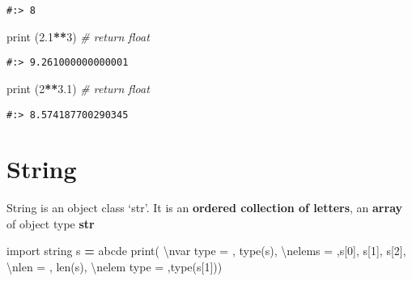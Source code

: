 \documentclass[
]{book}
\newenvironment{Shaded}{\begin{snugshade}}{\end{snugshade}}
\newcommand{\BuiltInTok}[1]{#1}
\newcommand{\CharTok}[1]{\textcolor[rgb]{0.5,0.5,0.5}{#1}}
\newcommand{\CommentTok}[1]{\textcolor[rgb]{0.37,0.37,0.37}{\textit{#1}}}
\newcommand{\DecValTok}[1]{\textcolor[rgb]{0.06,0.06,0.06}{#1}}
\newcommand{\FloatTok}[1]{\textcolor[rgb]{0.06,0.06,0.06}{#1}}
\newcommand{\ImportTok}[1]{#1}
\newcommand{\NormalTok}[1]{#1}
\newcommand{\OperatorTok}[1]{\textcolor[rgb]{0.43,0.43,0.43}{\textbf{#1}}}
\newcommand{\StringTok}[1]{\textcolor[rgb]{0.5,0.5,0.5}{#1}}
\begin{document}
\begin{verbatim}
#:> 8
\end{verbatim}

\begin{Shaded}
\begin{Highlighting}[]
\BuiltInTok{print}\NormalTok{ (}\FloatTok{2.1}\OperatorTok{**}\DecValTok{3}\NormalTok{)  }\CommentTok{\# return float}
\end{Highlighting}
\end{Shaded}

\begin{verbatim}
#:> 9.261000000000001
\end{verbatim}

\begin{Shaded}
\begin{Highlighting}[]
\BuiltInTok{print}\NormalTok{ (}\DecValTok{2}\OperatorTok{**}\FloatTok{3.1}\NormalTok{)  }\CommentTok{\# return float}
\end{Highlighting}
\end{Shaded}

\begin{verbatim}
#:> 8.574187700290345
\end{verbatim}

\hypertarget{string}{%
\section{String}\label{string}}

String is an object class `str'. It is an \textbf{ordered collection of letters}, an \textbf{array} of object type \textbf{str}

\begin{Shaded}
\begin{Highlighting}[]
\ImportTok{import}\NormalTok{ string}
\NormalTok{s }\OperatorTok{=} \StringTok{\textquotesingle{}abcde\textquotesingle{}}
\BuiltInTok{print}\NormalTok{( }\StringTok{\textquotesingle{}}\CharTok{\textbackslash{}n}\StringTok{var type  = \textquotesingle{}}\NormalTok{, }\BuiltInTok{type}\NormalTok{(s),}
       \StringTok{\textquotesingle{}}\CharTok{\textbackslash{}n}\StringTok{elems     = \textquotesingle{}}\NormalTok{,s[}\DecValTok{0}\NormalTok{], s[}\DecValTok{1}\NormalTok{], s[}\DecValTok{2}\NormalTok{],}
       \StringTok{\textquotesingle{}}\CharTok{\textbackslash{}n}\StringTok{len       = \textquotesingle{}}\NormalTok{, }\BuiltInTok{len}\NormalTok{(s),}
       \StringTok{\textquotesingle{}}\CharTok{\textbackslash{}n}\StringTok{elem type = \textquotesingle{}}\NormalTok{,}\BuiltInTok{type}\NormalTok{(s[}\DecValTok{1}\NormalTok{]))}
\end{Highlighting}
\end{Shaded}
\end{document}
